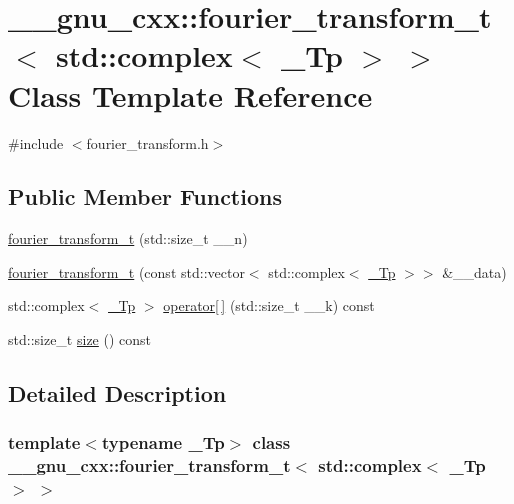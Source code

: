 \hypertarget{class____gnu__cxx_1_1fourier__transform__t_3_01std_1_1complex_3_01__Tp_01_4_01_4}{}\section{\+\_\+\+\_\+gnu\+\_\+cxx\+:\+:fourier\+\_\+transform\+\_\+t$<$ std\+:\+:complex$<$ \+\_\+\+Tp $>$ $>$ Class Template Reference}
\label{class____gnu__cxx_1_1fourier__transform__t_3_01std_1_1complex_3_01__Tp_01_4_01_4}


{\ttfamily \#include $<$fourier\+\_\+transform.\+h$>$}

\subsection*{Public Member Functions}
\begin{DoxyCompactItemize}
\item 
\hyperlink{class____gnu__cxx_1_1fourier__transform__t_3_01std_1_1complex_3_01__Tp_01_4_01_4_a215f06e5944b3666d4bd737154625317}{fourier\+\_\+transform\+\_\+t} (std\+::size\+\_\+t \+\_\+\+\_\+n)
\item 
\hyperlink{class____gnu__cxx_1_1fourier__transform__t_3_01std_1_1complex_3_01__Tp_01_4_01_4_a16c7b15061a8a9038df61d009def6ee1}{fourier\+\_\+transform\+\_\+t} (const std\+::vector$<$ std\+::complex$<$ \hyperlink{namespace____gnu__cxx_a3b19a9c800ca194374ef9172290f7d79}{\+\_\+\+Tp} $>$$>$ \&\+\_\+\+\_\+data)
\item 
std\+::complex$<$ \hyperlink{namespace____gnu__cxx_a3b19a9c800ca194374ef9172290f7d79}{\+\_\+\+Tp} $>$ \hyperlink{class____gnu__cxx_1_1fourier__transform__t_3_01std_1_1complex_3_01__Tp_01_4_01_4_aab8999adeedcd40323a2e3ee29531b24}{operator\mbox{[}$\,$\mbox{]}} (std\+::size\+\_\+t \+\_\+\+\_\+k) const
\item 
std\+::size\+\_\+t \hyperlink{class____gnu__cxx_1_1fourier__transform__t_3_01std_1_1complex_3_01__Tp_01_4_01_4_a1c6e363c86ed959497fd6ad5866802d6}{size} () const
\end{DoxyCompactItemize}


\subsection{Detailed Description}
\subsubsection*{template$<$typename \+\_\+\+Tp$>$\newline
class \+\_\+\+\_\+gnu\+\_\+cxx\+::fourier\+\_\+transform\+\_\+t$<$ std\+::complex$<$ \+\_\+\+Tp $>$ $>$}

